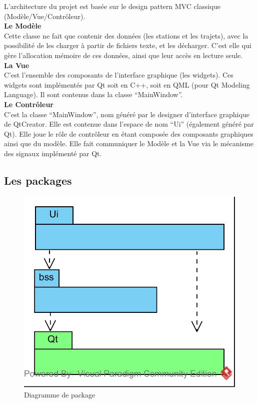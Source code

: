 \documentclass[12pt]{article}
\begin{document}
		L’architecture du projet est basée sur le design pattern MVC classique
		(Modèle/Vue/Contrôleur).\\
		
		\textbf{Le Modèle}\\
		Cette classe ne fait
		que contenir des données (les stations et les trajets), avec la possibilité de les
		charger à partir de fichiers texte, et les décharger. C’est elle qui gère
		l’allocation mémoire de ces données, ainsi que leur accès en lecture seule.\\
		
		\textbf{La Vue}\\
		C’est l’ensemble des composants de l’interface graphique (les widgets). Ces widgets
		sont implémentés par Qt soit en C++, soit en QML (pour Qt Modeling Language). Il sont
		contenus dans la classe “MainWindow”.\\
				
		\textbf{Le Contrôleur}\\
		C’est la classe “MainWindow”, nom généré par le designer d’interface graphique de
		QtCreator. Elle est contenue dans l’espace de nom “Ui” (également généré par Qt).
		Elle joue le rôle de contrôleur en étant composée des composants graphiques ainsi que
		du modèle. Elle fait communiquer le Modèle et la Vue via le mécanisme des signaux
		implémenté par Qt.\\
			
		\subsection{Les packages}
		\begin{figure}[!h]
		\begin{center}
		\includegraphics[scale=1]{dia_package.png}
		\caption{Diagramme de package}
		\label{fig:dia_package}
		\end{center}
		\end{figure}		
		
\end{document}
